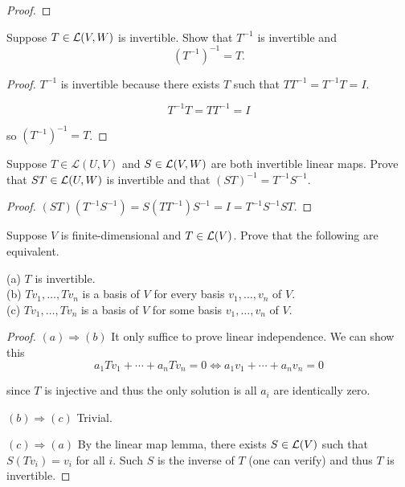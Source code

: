 \documentclass{extarticle}
\begin{document}
\begin{proof}

\end{proof}

\begin{problem}{1}
    Suppose \(T \in \mathcal{L}(V, W)\) is invertible. Show that \(T^{-1}\) is invertible and 
    \[(T^{-1})^{-1} = T.\]
\end{problem}

\begin{proof}
    \(T^{-1}\) is invertible because there exists \(T\) such that \(T T^{-1} = T^{-1} T  = I\). 

\[T^{-1} T = TT^{-1} = I\]

so \((T^{-1})^{-1} = T\).
\end{proof}

\begin{problem}{2}
    Suppose \(T \in \mathcal{L}(U, V)\) and \(S \in \mathcal{L}(V, W)\) are both invertible linear maps. 
    Prove that \(ST \in \mathcal{L}(U, W)\) is invertible and that \((ST)^{-1} = T^{-1}S^{-1}\).
\end{problem}

\begin{proof}
\((ST)(T^{-1}S^{-1}) = S(T T^{-1})S^{-1} = I = T^{-1}S^{-1}S T\).
\end{proof}

\begin{problem}{3}
    Suppose \(V\) is finite-dimensional and \(T \in \mathcal{L}(V)\). Prove that the following are equivalent.

    (a) \(T\) is invertible. \\ 
    (b) \(T v_1, \ldots, T v_n\) is a basis of \(V\) for every basis \(v_1, \ldots, v_n\) of \(V\). \\ 
    (c) \(T v_1, \ldots, T v_n\) is a basis of \(V\) for some basis \(v_1, \ldots, v_n\) of \(V\). 
\end{problem}

\begin{proof}
\((a) \Rightarrow (b)\) It only suffice to prove linear independence. We can show this 
\[a_1 Tv_1 + \cdots + a_n T v_n = 0 \Longleftrightarrow a_1 v_1 + \cdots + a_n v_n = 0\]

since \(T\) is injective and thus the only solution is all \(a_i\) are identically zero. 

\((b) \Rightarrow (c)\) Trivial. 

\((c) \Rightarrow (a)\) By the linear map lemma, there exists \(S \in \mathcal{L}(V)\) such that 
\(S(T v_i) = v_i\) for all \(i\). Such \(S\) is the inverse of \(T\) (one can verify) and thus 
\(T\) is invertible. 
\end{proof}
\end{document}
